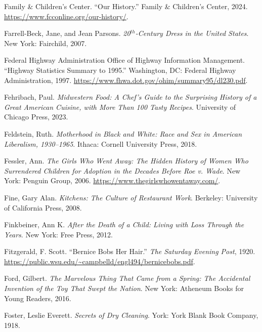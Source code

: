 \documentclass[
  american,
  letterpaper,
]{book}
\newlength{\cslhangindent}
\newenvironment{CSLReferences}[2] %
 {\begin{list}{}{%
  \setlength{\itemindent}{0pt}
  \setlength{\leftmargin}{0pt}
  \setlength{\parsep}{0pt}
  \ifodd #1
   \setlength{\leftmargin}{\cslhangindent}
   \setlength{\itemindent}{-1\cslhangindent}
  \fi
  \setlength{\itemsep}{#2\baselineskip}}}
 {\end{list}}
\begin{document}
\begin{CSLReferences}{1}{0}
Family \& Children's Center. {``Our History.''} Family \& Children's
Center, 2024. \url{https://www.fcconline.org/our-history/}.

Farrell-Beck, Jane, and Jean Parsons. \emph{{20\(^{th}\)-Century} Dress
in the United States}. New York: Fairchild, 2007.

Federal Highway Administration Office of Highway Information Management.
{``Highway Statistics Summary to 1995.''} Washington, DC: Federal
Highway Administration, 1997.
\url{https://www.fhwa.dot.gov/ohim/summary95/dl230.pdf}.

Fehribach, Paul. \emph{Midwestern Food: A Chef's Guide to the Surprising
History of a Great American Cuisine, with More Than 100 Tasty Recipes}.
University of Chicago Press, 2023.

Feldstein, Ruth. \emph{Motherhood in Black and White: Race and Sex in
American Liberalism, 1930--1965}. Ithaca: Cornell University Press,
2018.

Fessler, Ann. \emph{The Girls Who Went Away: The Hidden History of Women
Who Surrendered Children for Adoption in the Decades Before Roe v.
Wade}. New York: Penguin Group, 2006.
\url{https://www.thegirlswhowentaway.com/}.

Fine, Gary Alan. \emph{Kitchens: The Culture of Restaurant Work}.
Berkeley: University of California Press, 2008.

Finkbeiner, Ann K. \emph{After the Death of a Child: Living with Loss
Through the Years}. New York: Free Press, 2012.

Fitzgerald, F. Scott. {``Bernice Bobs Her Hair.''} \emph{The Saturday
Evening Post}, 1920.
\url{https://public.wsu.edu/~campbelld/engl494/bernicebobs.pdf}.

Ford, Gilbert. \emph{The Marvelous Thing That Came from a Spring: The
Accidental Invention of the Toy That Swept the Nation}. New York:
Atheneum Books for Young Readers, 2016.

Foster, Leslie Everett. \emph{Secrets of Dry Cleaning}. York: York Blank
Book Company, 1918.


\end{CSLReferences}
\end{document}

